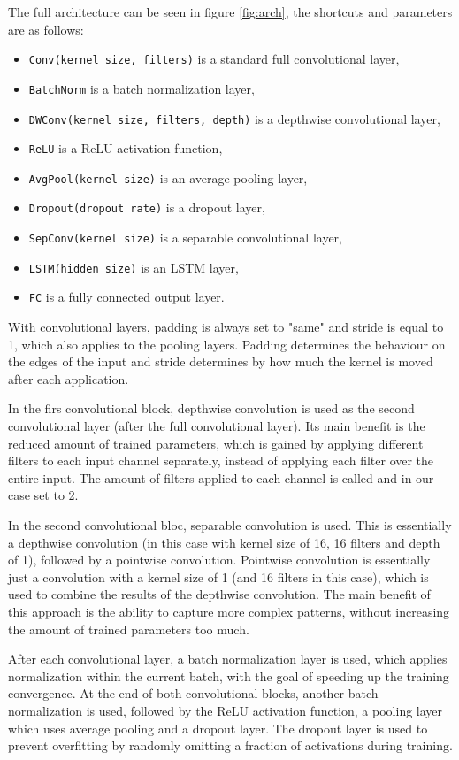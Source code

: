 \documentclass[english, he, bc, kiv, iso690alph]{fasthesis}
\begin{document}
The full architecture can be seen in figure \ref{fig:arch}, the shortcuts and parameters are as follows:

\begin{itemize}
	\item\texttt{Conv(kernel size, filters)} is a standard full convolutional layer,
	\item\texttt{BatchNorm} is a batch normalization layer,
	\item\texttt{DWConv(kernel size, filters, depth)} is a depthwise convolutional layer,
	\item\texttt{ReLU} is a ReLU activation function,
	\item\texttt{AvgPool(kernel size)} is an average pooling layer,
	\item\texttt{Dropout(dropout rate)} is a dropout layer,
	\item\texttt{SepConv(kernel size)} is a separable convolutional layer,
	\item\texttt{LSTM(hidden size)} is an LSTM layer,
	\item\texttt{FC} is a fully connected output layer.
\end{itemize}

With convolutional layers, padding is always set to "same" and stride is equal to 1, which also applies to the pooling layers. Padding determines the behaviour on the edges of the input and stride determines by how much the kernel is moved after each application.

In the firs convolutional block, depthwise convolution is used as the second convolutional layer (after the full convolutional layer). Its main benefit is the reduced amount of trained parameters, which is gained by applying different filters to each input channel separately, instead of applying each filter over the entire input. The amount of filters applied to each channel is called  and in our case set to 2.

In the second convolutional bloc, separable convolution is used. This is essentially a depthwise convolution (in this case with kernel size of 16, 16 filters and depth of 1), followed by a pointwise convolution. Pointwise convolution is essentially just a convolution with a kernel size of 1 (and 16 filters in this case), which is used to combine the results of the depthwise convolution. The main benefit of this approach is the ability to capture more complex patterns, without increasing the amount of trained parameters too much.

After each convolutional layer, a batch normalization layer is used, which applies normalization within the current batch, with the goal of speeding up the training convergence. At the end of both convolutional blocks, another batch normalization is used, followed by the ReLU activation function, a pooling layer which uses average pooling and a dropout layer. The dropout layer is used to prevent overfitting by randomly omitting a fraction of activations during training.
\end{document}

